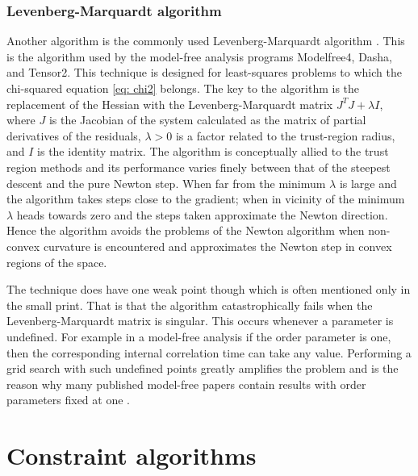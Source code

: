 \subsubsection{Levenberg-Marquardt algorithm}

Another algorithm is the commonly used Levenberg-Marquardt algorithm \citep{Levenberg44,Marquardt63}.
This is the algorithm used by the model-free analysis programs Modelfree4, Dasha, and Tensor2.
This technique is designed for least-squares problems to which the chi-squared equation \eqref{eq: chi2} belongs.
The key to the algorithm is the replacement of the Hessian with the Levenberg-Marquardt matrix $J^T J + \lambda I$, where $J$ is the Jacobian of the system calculated as the matrix of partial derivatives of the residuals, $\lambda > 0$ is a factor related to the trust-region radius, and $I$ is the identity matrix.
The algorithm is conceptually allied to the trust region methods and its performance varies finely between that of the steepest descent and the pure Newton step.
When far from the minimum $\lambda$ is large and the algorithm takes steps close to the gradient; when in vicinity of the minimum $\lambda$ heads towards zero and the steps taken approximate the Newton direction.
Hence the algorithm avoids the problems of the Newton algorithm when non-convex curvature is encountered and approximates the Newton step in convex regions of the space.

The technique does have one weak point though which is often mentioned only in the small print.
That is that the algorithm catastrophically fails when the Levenberg-Marquardt matrix is singular.
This occurs whenever a parameter is undefined.
For example in a model-free analysis if the order parameter is one, then the corresponding internal correlation time can take any value.
Performing a grid search with such undefined points greatly amplifies the problem and is the reason why many published model-free papers contain results with order parameters fixed at one \citep{dAuvergneGooley08a}.




\section{Constraint algorithms}
\label{sect: constraint algorithms}

